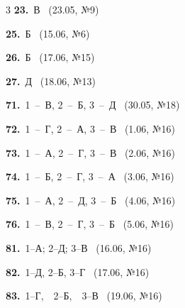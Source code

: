 \documentclass[12pt]{article}
\begin{document}
\ifshowsolutions
{}
\begin{multicols}{3}\noindent
\noindent\textbf{23.}~В \ {\scriptsize\color{gray}(23.05, №9)}\par
\noindent\textbf{25.}~Б \ {\scriptsize\color{gray}(15.06, №6)}\par
\noindent\textbf{26.}~Б \ {\scriptsize\color{gray}(17.06, №15)}\par
\noindent\textbf{27.}~Д \ {\scriptsize\color{gray}(18.06, №13)}\par
\noindent\textbf{71.}~1~--~В, 2~--~Б, 3~--~Д \ {\scriptsize\color{gray}(30.05, №18)}\par
\noindent\textbf{72.}~1~--~Г, 2~--~А, 3~--~В \ {\scriptsize\color{gray}(1.06, №16)}\par
\noindent\textbf{73.}~1~--~А, 2~--~Г, 3~--~В \ {\scriptsize\color{gray}(2.06, №16)}\par
\noindent\textbf{74.}~1~--~Б, 2~--~Г, 3~--~А \ {\scriptsize\color{gray}(3.06, №16)}\par
\noindent\textbf{75.}~1~--~А, 2~--~Д, 3~--~Б \ {\scriptsize\color{gray}(4.06, №16)}\par
\noindent\textbf{76.}~1~--~В, 2~--~Г, 3~--~Б \ {\scriptsize\color{gray}(5.06, №16)}\par
\noindent\textbf{81.}~1--А; 2--Д; 3--В \ {\scriptsize\color{gray}(16.06, №16)}\par
\noindent\textbf{82.}~1--Д, 2--Б, 3--Г \ {\scriptsize\color{gray}(17.06, №16)}\par
\noindent\textbf{83.}~1--Г,\ \ 2--Б,\ \ 3--В \ {\scriptsize\color{gray}(19.06, №16)}\par
\end{multicols}
\fi

\endgroup
\end{document}
